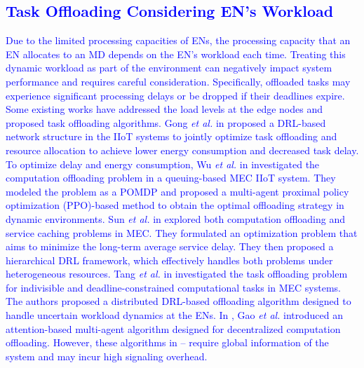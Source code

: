\documentclass[12pt,draftclsnofoot,onecolumn]{IEEEtran}
\begin{document}
	
	\textcolor{blue}{\subsection{Task Offloading Considering EN's Workload}
		Due to the limited processing capacities of ENs, the processing capacity that an EN allocates to an MD depends on the EN's workload each time. Treating this dynamic workload as part of the environment can negatively impact system performance and requires careful consideration. Specifically, offloaded tasks may experience significant processing delays or be dropped if their deadlines expire. Some existing works have addressed the load levels at the edge nodes and proposed task offloading algorithms.
		Gong \textit{et al.} in \cite{gong2022edge} proposed a DRL-based network structure in the IIoT systems to jointly optimize task offloading and resource allocation to achieve lower energy consumption and decreased task delay.
		To optimize delay and energy consumption, Wu \textit{et al.} in \cite{wu2023multi} investigated the computation offloading problem in a queuing-based MEC IIoT system. They modeled the problem as a POMDP and proposed a multi-agent proximal policy optimization (PPO)-based method to obtain the optimal offloading strategy in dynamic environments.
		Sun \textit{et al.} in \cite{sun2024hierarchical} explored both computation offloading and service caching problems in MEC. They formulated an optimization problem that aims to minimize the long-term average service delay. They then proposed a hierarchical DRL framework, which effectively handles both problems under heterogeneous resources.
		Tang \textit{et al.} in \cite{9253665} investigated the task offloading problem for indivisible and deadline-constrained computational tasks in MEC systems. The authors proposed a distributed DRL-based offloading algorithm designed to handle uncertain workload dynamics at the ENs. 
		In \cite{gao2022large}, Gao \textit{et al.} introduced an attention-based multi-agent algorithm designed for decentralized computation offloading.
		However, these algorithms in \cite{gong2022edge}–\cite{gao2022large} require global information of the system and may incur high signaling overhead.}
	
	
\end{document}
